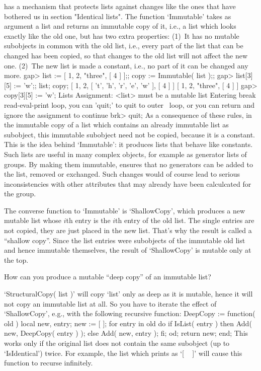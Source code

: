 {\GAP} has a mechanism that protects lists  against changes like the ones
that   have   bothered us in  section    "Identical lists".  The function
`Immutable' takes as argument a list and returns an immutable copy of it,
i.e.,  a list which looks   exactly like the old   one, but has two extra
properties: (1)~It has no mutable subobjects in common with the old list,
i.e., every part of the list that can be changed has been copied, so that
changes to the old list will not affect the new  one. (2)~The new list is
made a constant, i.e., no part of it can be changed any more.
\beginexample
    gap> list := [ 1, 2, "three", [ 4 ] ];; copy := Immutable( list );;
    gap> list[3][5] := 'w';; list; copy;
    [ 1, 2, [ 't', 'h', 'r', 'e', 'w' ], [ 4 ] ]
    [ 1, 2, "three", [ 4 ] ]
    gap> copy[3][5] := 'w';
    Lists Assignment: <list> must be a mutable list
    Entering break read-eval-print loop, you can 'quit;' to quit to outer \
    loop,
    or you can return and ignore the assignment to continue
    brk> quit;
\endexample
As a consequence of  these rules, in the  immutable copy of a list  which
contains an already immutable list as subobject, this immutable subobject
need not be copied,  because it is a   constant. This is the idea  behind
`Immutable': it produces lists that behave like constants. Such lists are
useful in many complex {\GAP} objects,  for example as generator lists of
groups. By  making them immutable, {\GAP}  ensures that no generators can
be added to the list, removed or exchanged. Such  changes would of course
lead  to serious inconsistencies with  other  attributes that may already
have been calculcated for the group.

The  converse function to  `Immutable' is `ShallowCopy', which produces a
new  mutable list whose $i$th entry  is the $i$th  entry of the old list.
The single entries are not copied, they are just  placed in the new list.
That's  why the result  is called   a ``shallow  copy''.  Since the  list
entries were subobjects of  the  immutable old  list and  hence immutable
themselves, the result of `ShallowCopy' is mutable only at the top.

\exercise How can  you produce  a  mutable ``deep copy'' of  an immutable
list?

\answer `StructuralCopy( list )' will copy `list' only as deep  as  it is
mutable, hence it will not copy an immutable list at all.  So you have to
iterate the effect  of `ShallowCopy', e.g.,  with the following recursive
function:
\begintt
    DeepCopy := function( old )
    local   new,  entry;
        new := [  ];  for entry  in old  do
        if IsList( entry )  then  Add( new, DeepCopy( entry ) );
                            else  Add( new, entry );  fi;  od;
        return new;
    end;
\endtt
This works only if the original list  does not contain the same subobject
(up to `IsIdentical') twice. For example, the list which {\GAP} prints as
`[ ~ ]' will cause this function to recurse infinitely.

